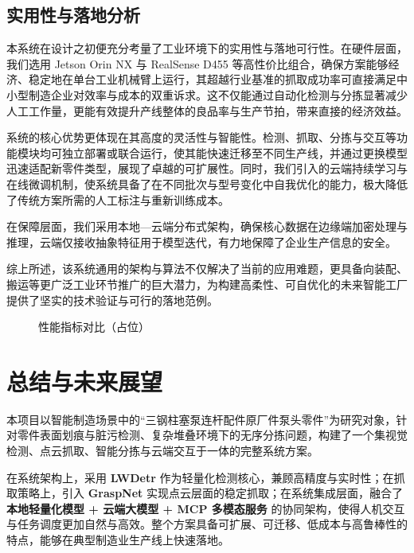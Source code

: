 \documentclass{cumcmthesis}
\begin{document}
\subsection{实用性与落地分析}

本系统在设计之初便充分考量了工业环境下的实用性与落地可行性。在硬件层面，我们选用 Jetson Orin NX 与 RealSense D455 等高性价比组合，确保方案能够经济、稳定地在单台工业机械臂上运行，其超越行业基准的抓取成功率可直接满足中小型制造企业对效率与成本的双重诉求。这不仅能通过自动化检测与分拣显著减少人工工作量，更能有效提升产线整体的良品率与生产节拍，带来直接的经济效益。

系统的核心优势更体现在其高度的灵活性与智能性。检测、抓取、分拣与交互等功能模块均可独立部署或联合运行，使其能快速迁移至不同生产线，并通过更换模型迅速适配新零件类型，展现了卓越的可扩展性。同时，我们引入的云端持续学习与在线微调机制，使系统具备了在不同批次与型号变化中自我优化的能力，极大降低了传统方案所需的人工标注与重新训练成本。

在保障层面，我们采用本地—云端分布式架构，确保核心数据在边缘端加密处理与推理，云端仅接收抽象特征用于模型迭代，有力地保障了企业生产信息的安全。

综上所述，该系统通用的架构与算法不仅解决了当前的应用难题，更具备向装配、搬运等更广泛工业环节推广的巨大潜力，为构建高柔性、可自优化的未来智能工厂提供了坚实的技术验证与可行的落地范例。

\begin{figure}[htbp]\centering
{}
\caption{性能指标对比（占位）}\label{fig:metrics}
\end{figure}

\section{总结与未来展望}

本项目以智能制造场景中的“三钢柱塞泵连杆配件原厂件泵头零件”为研究对象，针对零件表面划痕与脏污检测、复杂堆叠环境下的无序分拣问题，构建了一个集视觉检测、点云抓取、智能分拣与云端交互于一体的完整系统方案。

在系统架构上，采用 \textbf{LWDetr} 作为轻量化检测核心，兼顾高精度与实时性；在抓取策略上，引入 \textbf{GraspNet} 实现点云层面的稳定抓取；在系统集成层面，融合了 \textbf{本地轻量化模型 + 云端大模型 + MCP 多模态服务} 的协同架构，使得人机交互与任务调度更加自然与高效。整个方案具备可扩展、可迁移、低成本与高鲁棒性的特点，能够在典型制造业生产线上快速落地。
\end{document}
